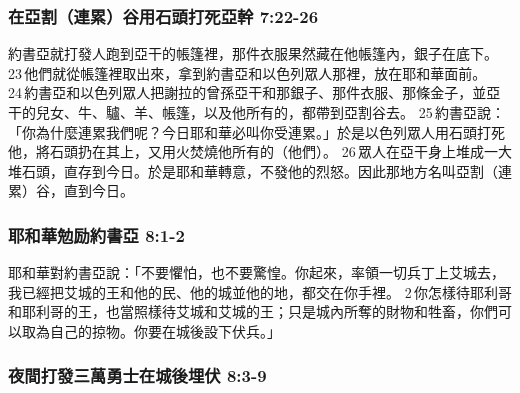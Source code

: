 \subsubsection{在亞割（連累）谷用石頭打死亞幹 7:22-26}
約書亞就打發人跑到亞干的帳篷裡，那件衣服果然藏在他帳篷內，銀子在底下。 23 他們就從帳篷裡取出來，拿到約書亞和以色列眾人那裡，放在耶和華面前。 24 約書亞和以色列眾人把謝拉的曾孫亞干和那銀子、那件衣服、那條金子，並亞干的兒女、牛、驢、羊、帳篷，以及他所有的，都帶到亞割谷去。 25 約書亞說：「你為什麼連累我們呢？今日耶和華必叫你受連累。」於是以色列眾人用石頭打死他，將石頭扔在其上，又用火焚燒他所有的（他們）。 26 眾人在亞干身上堆成一大堆石頭，直存到今日。於是耶和華轉意，不發他的烈怒。因此那地方名叫亞割（連累）谷，直到今日。

\subsubsection{耶和華勉励約書亞 8:1-2}
耶和華對約書亞說：「不要懼怕，也不要驚惶。你起來，率領一切兵丁上艾城去，我已經把艾城的王和他的民、他的城並他的地，都交在你手裡。 2 你怎樣待耶利哥和耶利哥的王，也當照樣待艾城和艾城的王；只是城內所奪的財物和牲畜，你們可以取為自己的掠物。你要在城後設下伏兵。」


\subsubsection{夜間打發三萬勇士在城後埋伏 8:3-9}

